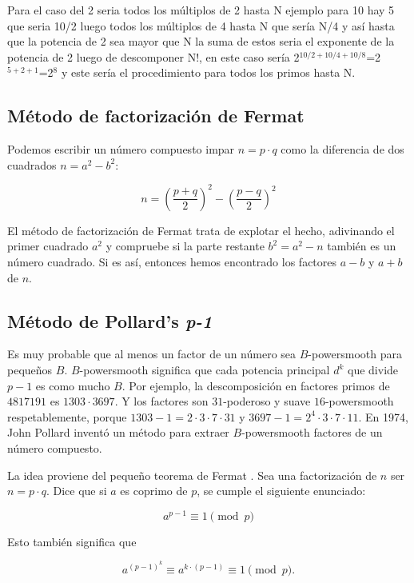 \hspace{0.5em}

Para el caso del 2 seria todos los múltiplos de 2 hasta N ejemplo para 10 hay 5 que seria 10/2 luego todos los múltiplos de 4 hasta N que sería N/4 y así hasta que la potencia de 2 sea mayor que N la suma de estos seria el exponente de la potencia de 2 luego de descomponer N!, en  este caso sería 2$^{10/2+10/4+10/8}$=2$^{5+2+1}$=2$^{8}$ y este sería el procedimiento para todos los primos hasta N.

\subsection{Método de factorización de Fermat}

Podemos escribir un número compuesto impar $n = p \cdot q$ como la diferencia de dos cuadrados $n = a^2 - b^2$:

$$n = \left(\frac{p + q}{2}\right)^2 - \left(\frac{p - q}{2}\right)^2$$

El método de factorización de Fermat trata de explotar el hecho, adivinando el primer cuadrado $a^2$ y compruebe si la parte restante $b^2 = a^2 - n$ también es un número cuadrado. Si es así, entonces hemos encontrado los factores $a - b$ y $a + b$ de $n$.

\subsection{Método de Pollard's \emph{p-1}}

Es muy probable que al menos un factor de un número sea $B$-powersmooth para pequeños $B$. $B$-powersmooth significa que cada potencia principal $d^k$ que divide $p-1$ es como mucho $B$. Por 
ejemplo, la descomposición en factores primos de $4817191$ es $1303 \cdot 3697$. Y los factores son $31$-poderoso y suave $16$-powersmooth respetablemente, porque $1303 - 1 = 2 \cdot 3 \cdot 7 \cdot 
31$ y $3697 - 1 = 2^4 \cdot 3 \cdot 7 \cdot 11$. En 1974, John Pollard inventó un método para extraer $B$-powersmooth factores de un número compuesto.

La idea proviene del pequeño teorema de Fermat . Sea una factorización de $n$ ser $n = p \cdot q$. Dice que si $a$ es coprimo de $p$, se cumple el siguiente enunciado:

$$ a^{p - 1} \equiv 1 \pmod{p} $$

Esto también significa que

$$ a^{(p - 1)^k} \equiv a^{k \cdot (p - 1)} \equiv 1 \pmod{p}. $$

